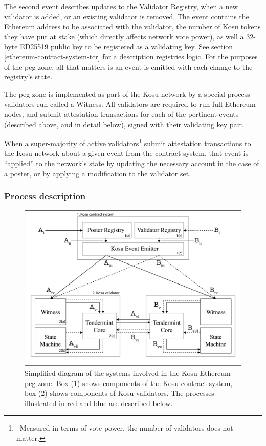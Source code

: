 \documentclass[10pt]{article}
\begin{document}
The second event describes updates to the Validator Registry, when a new validator is added, or an existing validator is removed. The event contains the Ethereum address to be associated with the validator, the number of Kosu tokens they have put at stake (which directly affects network vote power), as well a 32-byte ED25519 public key to be registered as a validating key\cite{tendermint-crypto-spec}. See section \ref{ethereum-contract-system-tcr} for a description registries logic. For the purposes of the peg-zone, all that matters is an event is emitted with each change to the registry’s state.
\medskip

The peg-zone is implemented as part of the Kosu network by a special process validators run called a Witness. All validators are required to run full Ethereum nodes, and submit attestation transactions for each of the pertinent events (described above, and in detail below), signed with their validating key pair. 
\medskip

When a super-majority of active validators\footnote{\ Measured in terms of vote power, the number of validators does not matter.} submit attestation transactions to the Kosu network about a given event from the contract system, that event is “applied” to the network’s state by updating the necessary account in the case of a poster, or by applying a modification to the validator set.
\subsubsection{Process description}\label{peg-process}
\begin{figure}[H]
  \centering
  \includegraphics[width=\textwidth]{../figures/fig1.png}
  \caption{Simplified diagram of the systems involved in the Kosu-Ethereum peg zone. Box (1) shows components of the Kosu contract system, box (2) shows components of Kosu validators. The processes illustrated in red and blue are described below.}
  \label{fig:fig2}
\end{figure}
\end{document}
